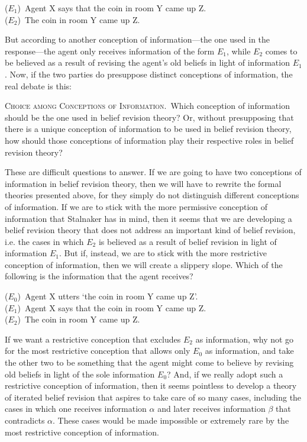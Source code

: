 	\xm ($E_1$)\, Agent X says that the coin in room Y came up Z.
	\\ ($E_2$)\, The coin in room Y came up Z.

\ed 
But according to another conception of information---the one used in the response---the agent only receives information of the form $E_1$, while $E_2$ comes to be believed as a result of revising the agent's old beliefs in light of information $E_1$. Now, if the two parties do presuppose distinct conceptions of information, the real debate is this:\op

	\xm \textsc{Choice among Conceptions of Information.}\, Which conception of information should be the one used in belief revision theory? Or, without presupposing that there is a unique conception of information to be used in belief revision theory, how should those conceptions of information play their respective roles in belief revision theory? 

\ed These are difficult questions to answer. If we are going to have two conceptions of information in belief revision theory, then we will have to rewrite the formal theories presented above, for they simply do not distinguish different conceptions of information. If we are to stick with the more permissive conception of information that Stalnaker has in mind, then it seems that we are developing a belief revision theory that does not address an important kind of belief revision, i.e. the cases in which $E_2$ is believed as a result of belief revision in light of information $E_1$. But if, instead, we are to stick with the more restrictive conception of information, then we will create a slippery slope. Which of the following is the information that the agent receives?\op

	\xm ($E_0$)\, Agent X utters `the coin in room Y came up Z'. 
	\\ ($E_1$)\, Agent X says that the coin in room Y came up Z.
	\\ ($E_2$)\, The coin in room Y came up Z.

\ed If we want a restrictive conception that excludes $E_2$ as information, why not go for the most restrictive conception that allows only $E_0$ as information, and take the other two to be something that the agent might come to believe by revising old beliefs in light of the sole information $E_0$? And, if we really adopt such a restrictive conception of information, then it seems pointless to develop a theory of iterated belief revision that aspires to take care of so many cases, including the cases in which one receives information $\alpha$ and later receives information $\beta$ that contradicts $\alpha$. These cases would be made impossible or extremely rare by the most restrictive conception of information. 

